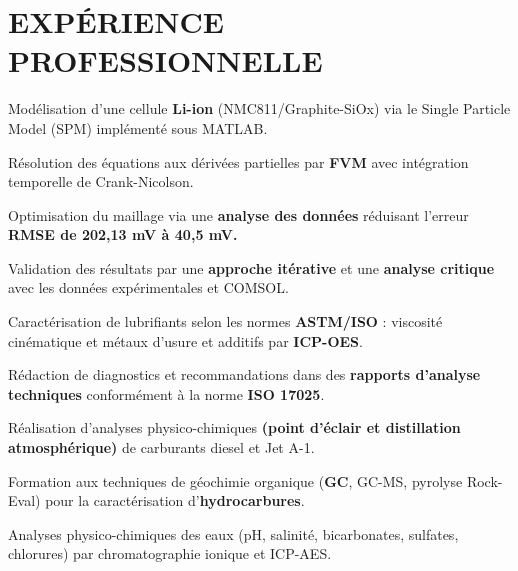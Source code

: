 \documentclass[10pt]{article}
\begin{document}
\section{EXPÉRIENCE PROFESSIONNELLE}
\begin{bul}
\item Modélisation d'une cellule \textbf{Li-ion} (NMC811/Graphite-SiOx) via le Single Particle Model (SPM) implémenté sous MATLAB.
\item Résolution des équations aux dérivées partielles par \textbf{FVM} avec intégration temporelle de Crank-Nicolson.
\item Optimisation du maillage via une \textbf{analyse des données} réduisant l'erreur \textbf{RMSE de 202,13 mV à 40,5 mV.}
\item Validation des résultats par une \textbf{approche itérative} et une \textbf{analyse critique} avec les données expérimentales et COMSOL.
\end{bul}
\begin{bul}
\item Caractérisation de lubrifiants selon les normes \textbf{ASTM/ISO} : viscosité cinématique et métaux d'usure et additifs par \textbf{ICP-OES}.
\item Rédaction de diagnostics et recommandations dans des \textbf{rapports d'analyse techniques} conformément à la norme \textbf{ISO 17025}.
\end{bul}
\begin{bul}
\item Réalisation d'analyses physico-chimiques \textbf{(point d'éclair et distillation atmosphérique)} de carburants diesel et Jet A-1.
\end{bul}
\begin{bul}
\item Formation aux techniques de géochimie organique (\textbf{GC}, GC-MS, pyrolyse Rock-Eval) pour la caractérisation d'\textbf{hydrocarbures}.
\item Analyses physico-chimiques des eaux (pH, salinité, bicarbonates, sulfates, chlorures) par chromatographie ionique et ICP-AES.
\end{bul}
\end{document}
